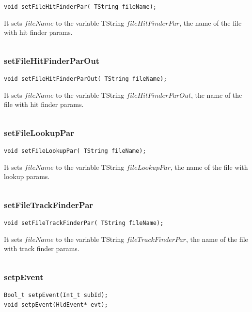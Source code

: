 \documentclass[a4paper]{book}
\begin{document}
\begin{lstlisting}
void setFileHitFinderPar( TString fileName);
\end{lstlisting}

It sets $fileName$ to the variable TString $fileHitFinderPar$, the name of the file with hit finder params.

\[\]

\subsubsection{setFileHitFinderParOut}

\begin{lstlisting}
void setFileHitFinderParOut( TString fileName);
\end{lstlisting}

It sets $fileName$ to the variable TString $fileHitFinderParOut$, the name of the file with hit finder params.

\[\]

\subsubsection{setFileLookupPar}

\begin{lstlisting}
void setFileLookupPar( TString fileName);
\end{lstlisting}

It sets $fileName$ to the variable TString $fileLookupPar$, the name of the file with lookup params.

\[\]

\subsubsection{setFileTrackFinderPar}

\begin{lstlisting}
void setFileTrackFinderPar( TString fileName);
\end{lstlisting}

It sets $fileName$ to the variable TString $fileTrackFinderPar$, the name of the file with track finder params.

\[\]

\subsubsection{setpEvent}

\begin{lstlisting}
Bool_t setpEvent(Int_t subId);
void setpEvent(HldEvent* evt);
\end{lstlisting}
\end{document}
